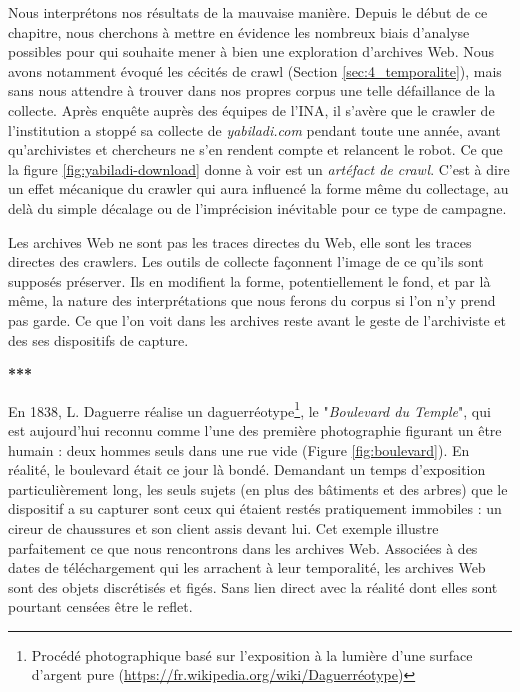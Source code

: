 \documentclass[symmetric,justified,marginals=raggedouter]{tufte-book}
\begin{document}
\noindent Nous interprétons nos résultats de la mauvaise manière. Depuis le début de ce chapitre, nous cherchons à mettre en évidence les nombreux biais d'analyse possibles pour qui souhaite mener à bien une exploration d'ar\-chives Web. Nous avons notamment évoqué les cécités de crawl (Section \ref{sec:4_temporalite}), mais sans nous attendre à trouver dans nos propres corpus une telle défaillance de la collecte. Après enquête auprès des équipes de l'INA, il s'avère que le crawler de l'institution a stoppé sa collecte de \textit{yabiladi.com} pendant toute une année, avant qu'archivistes et chercheurs ne s'en rendent compte et relancent le robot. Ce que la figure \ref{fig:yabiladi-download} donne à voir est un \textit{artéfact de crawl}. C'est à dire un effet mécanique du crawler qui aura influencé la forme même du collectage, au delà du simple décalage ou de l'imprécision inévitable pour ce type de campagne. 

Les archives Web ne sont pas les traces directes du Web, elle sont les traces directes des crawlers. Les outils de collecte façonnent l'image de ce qu'ils sont supposés préserver. Ils en modifient la forme, potentiellement le fond, et par là même, la nature des interprétations que nous ferons du corpus si l'on n'y prend pas garde. Ce que l'on voit dans les archives reste avant le geste de l'archiviste et des ses dispositifs de capture. 

\begin{center}
	\textbf{***}
\end{center}

\noindent En 1838, L. Daguerre réalise un daguerréotype\footnote{Procédé photographique basé sur l'exposition à la lumière d'une surface d'argent pure (\url{https://fr.wikipedia.org/wiki/Daguerréotype})}, le "\textit{Boulevard du Temple}", qui est aujourd'hui reconnu comme l'une des première photographie figurant un être humain : deux hommes seuls dans une rue vide (Figure \ref{fig:boulevard}). En réalité, le boulevard était ce jour là bondé. Demandant un temps d'exposition particulièrement long, les seuls sujets (en plus des bâtiments et des arbres) que le dispositif a su capturer sont ceux qui étaient restés pratiquement immobiles : un cireur de chaussures et son client assis devant lui. Cet exemple illustre parfaitement ce que nous rencontrons dans les archives Web. Associées à des dates de téléchargement qui les arrachent à leur temporalité, les archives Web sont des objets discrétisés et figés. Sans lien direct avec la réalité dont elles sont pourtant censées être le reflet. 
\end{document}
